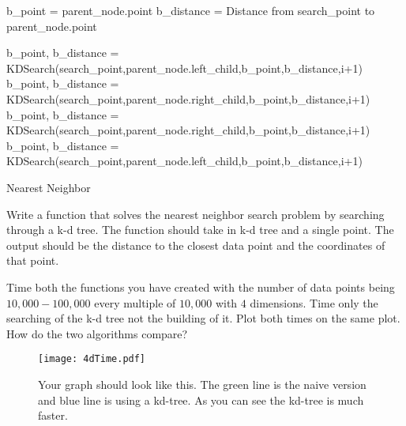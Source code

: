 \begin{algorithm}
\begin{algorithmic}[1]
        \State b\_point = parent\_node.point
        \State b\_distance = Distance from search\_point to parent\_node.point
    \EndIf

        \State b\_point, b\_distance =
            \State KDSearch(search\_point,parent\_node.left\_child,b\_point,b\_distance,i+1)
            \State b\_point, b\_distance = 
                \State KDSearch(search\_point,parent\_node.right\_child,b\_point,b\_distance,i+1)
        \EndIf
    \Else
        \State b\_point, b\_distance = 
            \State KDSearch(search\_point,parent\_node.right\_child,b\_point,b\_distance,i+1)
            \State b\_point, b\_distance = 
                \State KDSearch(search\_point,parent\_node.left\_child,b\_point,b\_distance,i+1)
        \EndIf
    \EndIf
\EndProcedure
\end{algorithmic}
\caption{Nearest Neighbor}
\label{alg:nearestneighbor}
\end{algorithm}


\begin{problem}
Write a function that solves the nearest neighbor search problem by searching through a k-d tree.
The function should take in k-d tree and a single point.
The output should be the distance to the closest data point and the coordinates of that point. 
\end{problem}

\begin{problem}
Time both the functions you have created with the number of data points being $10,000-100,000$ every multiple of $10,000$ with $4$ dimensions.
Time only the searching of the k-d tree not the building of it.
Plot both times on the same plot.
How do the two algorithms compare?
\end{problem}

\begin{figure}[H]
\texttt{[image: 4dTime.pdf]}
\caption{Your graph should look like this.
The green line is the naive version and blue line is using a kd-tree.
As you can see the kd-tree is much faster.}
\end{figure}

